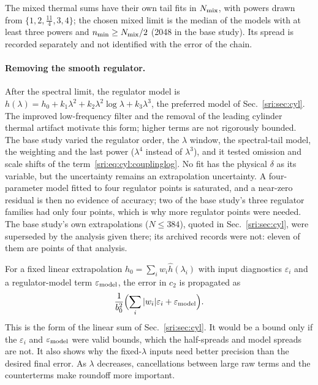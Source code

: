 The mixed thermal sums have their own tail fits in $N_{\rm mix}$, with powers drawn from $\{1,2,\frac{11}4,3,4\}$; the
chosen mixed limit is the median of the models with at least three powers and $n_{\min}\ge N_{\rm mix}/2$ (2048 in the
base study). Its spread is recorded separately and not identified with the error of the chain.

\paragraph{Removing the smooth regulator.} After the spectral limit, the regulator model is
$h(\lambda)=h_0+k_1\lambda^2+k_2\lambda^2\log\lambda+k_3\lambda^3$, the preferred model of Sec.~\ref{sri:sec:cyl}. The
improved low-frequency filter and the removal of the leading cylinder thermal artifact motivate this form; higher terms
are not rigorously bounded. The base study varied the regulator order, the $\lambda$ window, the spectral-tail model,
the weighting and the last power ($\lambda^4$ instead of $\lambda^3$), and it tested omission and scale shifts of the
term~\eqref{sri:eq:cyl:couplinglog}. No fit has the physical $\delta$ as its variable, but the uncertainty remains an
extrapolation uncertainty. A four-parameter model fitted to four regulator points is saturated, and a near-zero residual
is then no evidence of accuracy; two of the base study's three regulator families had only four points, which is why more
regulator points were needed. The base study's own extrapolations ($N\le384$), quoted in Sec.~\ref{sri:sec:cyl}, were
superseded by the analysis given there; its archived records were not: eleven of them are points of that analysis.

For a fixed linear extrapolation $\hat h_0=\sum_iw_i\hat h(\lambda_i)$ with input diagnostics $\varepsilon_i$ and a
regulator-model term $\varepsilon_{\rm model}$, the error in $c_2$ is propagated as
\begin{equation}
 \frac1{b_0^2}\Bigl(\sum_i|w_i|\varepsilon_i+\varepsilon_{\rm model}\Bigr).
 \label{sri:eq:cyl:budget}
\end{equation}
This is the form of the linear sum of Sec.~\ref{sri:sec:cyl}. It would be a bound only if the $\varepsilon_i$ and
$\varepsilon_{\rm model}$ were valid bounds, which the half-spreads and model spreads are not. It also shows why the
fixed-$\lambda$ inputs need better precision than the desired final error. As $\lambda$ decreases, cancellations between
large raw terms and the counterterms make roundoff more important.

